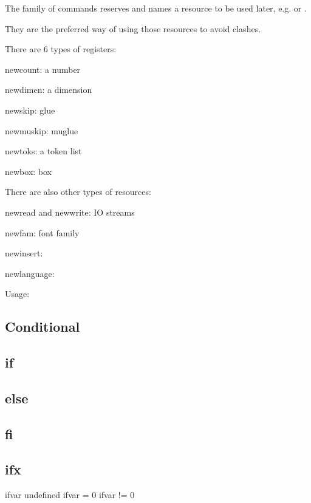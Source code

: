     The  family of commands reserves and names a resource to be used later, e.g.  or .

    They are the preferred way of using those resources to avoid clashes.

    There are 6 types of registers:

    \item newcount:  a number
    \item newdimen:  a dimension
    \item newskip:   glue
    \item newmuskip: muglue
    \item newtoks:   a token list
    \item newbox:    box

    There are also other types of resources:

    \item newread and newwrite: IO streams
    \item newfam:               font family
    \item newinsert:
    \item newlanguage:

    Usage:

    \newcount\x
    \number\x

  \subsection{Conditional}

  \subsection{if}

  \subsection{else}

  \subsection{fi}

  \subsection{ifx}

    \ifx\ifvar\undefined
      ifvar undefined
    \else
      \if{}
        ifvar = 0
      \else
        ifvar != 0
      \fi
    \fi

